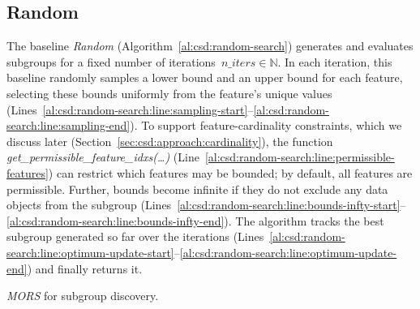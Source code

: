 \documentclass[acmsmall]{acmart} %
\theoremstyle{acmplain}
\theoremstyle{acmdefinition}
\begin{document}
\subsection{Random}
\label{sec:csd:baselines:random}

The baseline \emph{Random} (Algorithm~\ref{al:csd:random-search}) generates and evaluates subgroups for a fixed number of iterations~$\mathit{n\_iters} \in \mathbb{N}$. 
In each iteration, this baseline randomly samples a lower bound and an upper bound for each feature, selecting these bounds uniformly from the feature's unique values (Lines~\ref{al:csd:random-search:line:sampling-start}--\ref{al:csd:random-search:line:sampling-end}).
To support feature-cardinality constraints, which we discuss later (Section~\ref{sec:csd:approach:cardinality}), the function \emph{get\_permissible\_feature\_idxs(\dots)} (Line~\ref{al:csd:random-search:line:permissible-features}) can restrict which features may be bounded; by default, all features are permissible.
Further, bounds become infinite if they do not exclude any data objects from the subgroup (Lines~\ref{al:csd:random-search:line:bounds-infty-start}--\ref{al:csd:random-search:line:bounds-infty-end}).
The algorithm tracks the best subgroup generated so far over the iterations (Lines~\ref{al:csd:random-search:line:optimum-update-start}--\ref{al:csd:random-search:line:optimum-update-end}) and finally returns it.

\begin{algorithm}[t]
	\DontPrintSemicolon
	\BlankLine
	\caption{\emph{MORS} for subgroup discovery.}
	\label{al:csd:mors}
\end{algorithm}
\end{document}
